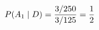 \documentclass[preview]{standalone}
\begin{document}
\begin{align*}
\special{dvisvgm:raw <g id='unique000'>}P(A_1\mid D)=\frac{3/250}{3/125}=\frac12\special{dvisvgm:raw </g>}
\end{align*}
\end{document}
